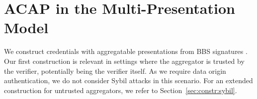 \section{ACAP in the Multi-Presentation Model} \label{sec:constr:acap}
We construct credentials with aggregatable presentations from BBS signatures \cite{DBLP:conf/eurocrypt/TessaroZ23a}. Our first construction is relevant in settings where the aggregator is trusted by the verifier, potentially being the verifier itself. As we require data origin authentication, we do not consider Sybil attacks in this scenario. For an extended construction for untrusted aggregators, we refer to Section~\ref{sec:constr:sybil}.


